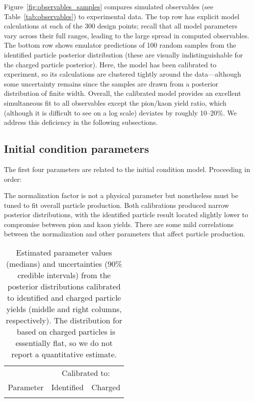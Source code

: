 \documentclass[aps,prc,reprint,amsmath,nofootinbib]{revtex4-1}
\newcommand{\paddedhline}{\noalign{\smallskip}\hline\noalign{\smallskip}}
\begin{document}
Figure~\ref{fig:observables_samples} compares simulated observables (see Table~\ref{tab:observables}) to experimental data.
The top row has explicit model calculations at each of the 300 design points;
recall that all model parameters vary across their full ranges, leading to the large spread in computed observables.
The bottom row shows emulator predictions of 100 random samples from the identified particle posterior distribution (these are visually indistinguishable for the charged particle posterior).
Here, the model has been calibrated to experiment, so its calculations are clustered tightly around the data---although some uncertainty remains since the samples are drawn from a posterior distribution of finite width.
Overall, the calibrated model provides an excellent simultaneous fit to all observables except the pion/kaon yield ratio, which (although it is difficult to see on a log scale) deviates by roughly 10--20\%.
We address this deficiency in the following subsections.


\subsection{Initial condition parameters}

The first four parameters are related to the initial condition model.
Proceeding in order:

The normalization factor is not a physical parameter but nonetheless must be tuned to fit overall particle production.
Both calibrations produced narrow posterior distributions, with the identified particle result located slightly lower to compromise between pion and kaon yields.
There are some mild correlations between the normalization and other parameters that affect particle production.

\begin{table}
  \caption{
    \label{tab:posterior}
    Estimated parameter values (medians) and uncertainties (90\% credible intervals) from the posterior distributions calibrated to identified and charged particle yields (middle and right columns, respectively).
    The distribution for \Tsw\ based on charged particles is essentially flat, so we do not report a quantitative estimate.
  }
  \begin{ruledtabular}
    \begin{tabular}{lll}
      & \multicolumn{2}{c}{Calibrated to:} \\
      \noalign{\smallskip}\cline{2-3}\noalign{\smallskip}
      Parameter & \multicolumn{1}{c}{Identified} & \multicolumn{1}{c}{Charged} \\
      \paddedhline
      
    \end{tabular}
  \end{ruledtabular}
\end{table}
\end{document}
